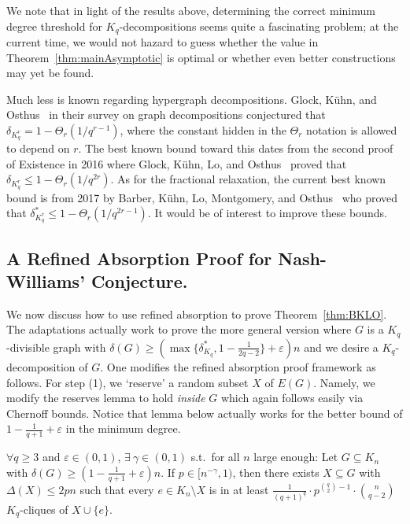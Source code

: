 \documentclass[twoside,leqno]{article}
\begin{document}
We note that in light of the results above, determining the correct minimum degree threshold for $K_q$-decompositions seems quite a fascinating problem; at the current time, we would not hazard to guess whether the value in Theorem~\ref{thm:mainAsymptotic} is optimal or whether even better constructions may yet be found.

Much less is known regarding hypergraph decompositions. Glock, K\"{u}hn, and Osthus~\cite{GKO20Survey} in their survey on graph decompositions conjectured that $\delta_{K^r_q}=1-\Theta_r(1/q^{r-1})$, where the constant hidden in the $\Theta_r$ notation is allowed to depend on $r$. The best known bound toward this dates from the second proof of Existence in 2016 where Glock, K\"{u}hn, Lo, and Osthus~\cite{GKLO16} proved that $\delta_{K^r_q}\le 1-\Theta_r(1/q^{2r})$. As for the fractional relaxation, the current best known bound is from 2017 by Barber, K\"{u}hn, Lo, Montgomery, and Osthus~\cite{BKLMO17} who proved that $\delta^*_{K_q^r}\leq1-\Theta_r(1/q^{2r-1})$. It would be of interest to improve these bounds. 

\subsection{A Refined Absorption Proof for Nash-Williams' Conjecture.}

We now discuss how to use refined absorption to prove Theorem~\ref{thm:BKLO}. The adaptations actually work to prove the more general version where $G$ is a $K_q$-divisible graph with $\delta(G)\ge \left(\max\{\delta_{K_q}^*, 1-\frac{1}{2q-2}\}+\varepsilon\right)n$ and we desire a $K_q$-decomposition of $G$. One modifies the refined absorption proof framework as follows. For step (1), we `reserve' a random subset $X$ of $E(G)$. Namely, we modify the reserves lemma to hold \emph{inside} $G$ which again follows easily via Chernoff bounds. Notice that lemma below actually works for the better bound of $1-\frac{1}{q+1}+\varepsilon$ in the minimum degree.

\begin{lem}\label{lem:RandomXHighMinDeg}
$\forall q \ge 3$ and $\varepsilon\in (0,1)$, $\exists~\gamma \in (0,1)$ s.t.~for all $n$ large enough: Let $G \subseteq K_n$ with $\delta(G)\ge (1-\frac{1}{q+1}+\varepsilon)n$. If $p\in [n^{-\gamma},1)$, then there exists $X\subseteq G$ with $\Delta(X)\le 2pn$ such that every $e\in K_n\setminus X$ is in at least $\frac{1}{(q+1)^q}\cdot p^{\binom{q}{2}-1}\cdot \binom{n}{q-2}$ $K_q$-cliques of $X\cup \{e\}$.
\end{lem}
\end{document}
